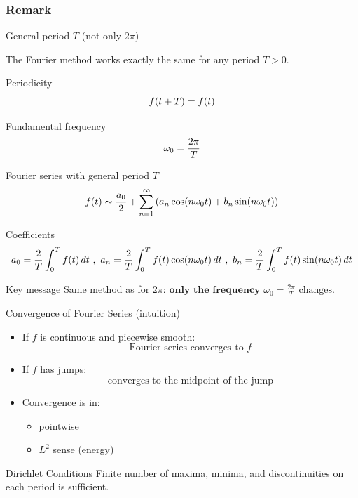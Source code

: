 \documentclass[aspectratio=169]{beamer}
\begin{document}
\subsubsection{Remark}


\begin{frame}{General period $T$ (not only $2\pi$)}

The Fourier method works exactly the same for any period $T>0$.

\begin{block}{Periodicity}
\vspace{-5mm}
\[
f(t+T)=f(t)
\vspace{-5mm}
\]
\end{block}
\pause
\begin{block}{Fundamental frequency}
\vspace{-5mm}
\[
\omega_0=\frac{2\pi}{T}
\vspace{-5mm}
\]
\end{block}
\pause
\begin{block}{Fourier series with general period $T$}
\vspace{-2mm}
\[
f(t)\sim
\frac{a_0}{2}
+\sum_{n=1}^{\infty}
\left(
a_n\cos(n\omega_0 t)+
b_n\sin(n\omega_0 t)
\right)
\vspace{-9mm}
\]
\end{block}
\pause
\begin{block}{Coefficients}
\[
a_0=\frac{2}{T}\int_{0}^{T} f(t)\,dt
\,\, , \,\, 
a_n=\frac{2}{T}\int_{0}^{T} f(t)\cos(n\omega_0 t)\,dt
\,\, , \,\,
b_n=\frac{2}{T}\int_{0}^{T} f(t)\sin(n\omega_0 t)\,dt
\vspace{-7mm}
\]
\end{block}
\pause
\begin{block}{Key message}
Same method as for $2\pi$: $
\textbf{only the frequency } \omega_0=\frac{2\pi}{T} \text{ changes.}$
\end{block}
\end{frame}


\begin{frame}{Convergence of Fourier Series (intuition)}

\begin{itemize}
    \item If \(f\) is continuous and piecewise smooth:
    \[
    \text{Fourier series converges to } f
    \]
    \item If \(f\) has jumps:
    \[
    \text{converges to the midpoint of the jump}
    \]
    \item Convergence is in:
    \begin{itemize}
        \item pointwise
        \item \(L^2\) sense (energy)
    \end{itemize}
\end{itemize}
\pause
\begin{block}{Dirichlet Conditions}
Finite number of maxima, minima, and discontinuities on each period is sufficient.
\end{block}

\end{frame}
\end{document}
